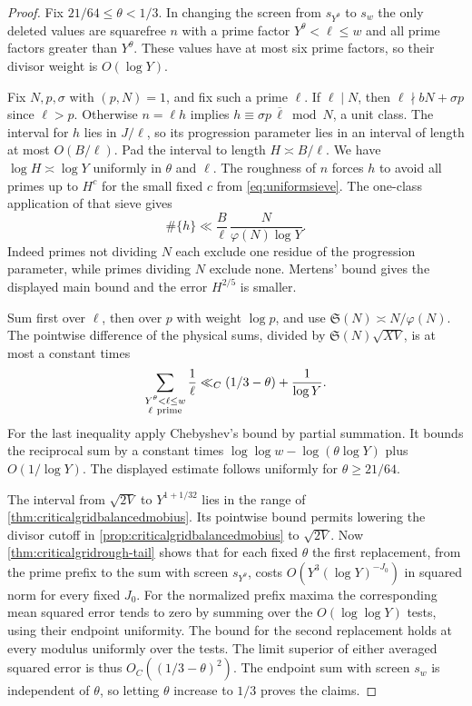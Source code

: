 \documentclass[11pt,a4paper]{article}
\numberwithin{equation}{section}
\newcommand{\SSS}{\mathfrak S}
\begin{document}
\begin{proof}
Fix $21/64\le\theta<1/3$. In changing the screen
from $s_{Y^\theta}$ to $s_w$ the only deleted values
are squarefree $n$ with a prime factor
$Y^\theta<\ell\le w$ and all prime factors greater
than $Y^\theta$. These values have at most six prime
factors, so their divisor weight is $O(\log Y)$.

Fix $N,p,\sigma$ with $(p,N)=1$, and fix such a prime
$\ell$. If $\ell\mid N$, then $\ell\nmid bN+\sigma p$
since $\ell>p$. Otherwise $n=\ell h$ implies
$h\equiv \sigma p\,\overline\ell\bmod N$, a unit class.
The interval for $h$ lies in $J/\ell$, so its
progression parameter lies in an interval of length
at most $O(B/\ell)$. Pad the interval to length
$H\asymp B/\ell$. We have $\log H\asymp\log Y$
uniformly in $\theta$ and $\ell$. The roughness of $n$
forces $h$ to avoid all primes up to $H^c$ for the
small fixed $c$ from \cref{eq:uniformsieve}.
The one-class application of that sieve gives
\[
 \#\{h\}\ll \frac{B}{\ell}\,
                    \frac{N}{\varphi(N)\log Y}.
\]
Indeed primes not dividing $N$ each exclude one
residue of the progression parameter, while primes
dividing $N$ exclude none. Mertens' bound gives the
displayed main bound and the error $H^{2/5}$ is smaller.

Sum first over $\ell$, then over $p$ with weight
$\log p$, and use $\SSS(N)\asymp N/\varphi(N)$.
The pointwise difference of the physical sums, divided
by $\SSS(N)\sqrt{XV}$, is at most a constant times
\[
 \sum_{\substack{Y^\theta<\ell\le w\\\ell\ {\rm prime}}}
        \frac1\ell
 \ll_C (1/3-\theta)+\frac{1}{\log Y}.
\]
For the last inequality apply Chebyshev's bound by
partial summation. It bounds the reciprocal sum by
a constant times $\log\log w-\log(\theta\log Y)$
plus $O(1/\log Y)$. The displayed estimate follows
uniformly for $\theta\ge21/64$.

The interval from $\sqrt{2V}$ to $Y^{1+1/32}$ lies
in the range of \cref{thm:criticalgridbalancedmobius}.
Its pointwise bound permits lowering the divisor cutoff
in \cref{prop:criticalgridbalancedmobius} to $\sqrt{2V}$.
Now \cref{thm:criticalgridrough-tail} shows that for
each fixed $\theta$ the first replacement, from the
prime prefix to the sum with screen $s_{Y^\theta}$,
costs $O(Y^3(\log Y)^{-J_0})$ in squared norm for
every fixed $J_0$.
For the normalized prefix maxima the corresponding mean
squared error tends to zero by summing over the
$O(\log\log Y)$ tests, using their endpoint uniformity.
The bound for the second replacement holds at every
modulus uniformly over the tests. The limit superior
of either averaged squared error is thus
$O_C((1/3-\theta)^2)$. The endpoint sum with screen
$s_w$ is independent of $\theta$, so letting
$\theta$ increase to $1/3$ proves the claims.


\end{proof}
\end{document}
